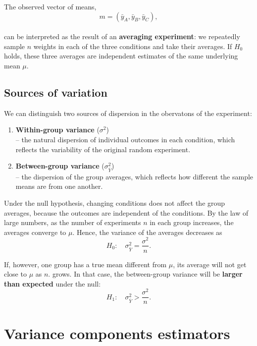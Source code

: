 \documentclass[
]{book}
\begin{document}
The observed vector of means,\\
\[
m = (\bar{y}_A, \bar{y}_B, \bar{y}_C),
\]\\
can be interpreted as the result of an \textbf{averaging experiment}: we repeatedly sample \(n\) weights in each of the three conditions and take their averages. If \(H_0\) holds, these three averages are independent estimates of the same underlying mean \(\mu\).

\hypertarget{sources-of-variation}{%
\subsection{Sources of variation}\label{sources-of-variation}}

We can distinguish two sources of dispersion in the obervatons of the experiment:

\begin{enumerate}
\def\labelenumi{\arabic{enumi}.}
\item
  \textbf{Within-group variance} (\(\sigma^2\))\\
  -- the natural dispersion of individual outcomes in each condition, which reflects the variability of the original random experiment.
\item
  \textbf{Between-group variance} (\(\sigma^2_{\bar{Y}}\))\\
  -- the dispersion of the group averages, which reflects how different the sample means are from one another.
\end{enumerate}

Under the null hypothesis, changing conditions does not affect the group averages, because the outcomes are independent of the conditions. By the law of large numbers, as the number of experiments \(n\) in each group increases, the averages converge to \(\mu\). Hence, the variance of the averages decreases as\\
\[
H_0: \quad \sigma^2_{\bar{Y}} = \frac{\sigma^2}{n}.
\]

If, however, one group has a true mean different from \(\mu\), its average will not get close to \(\mu\) as \(n.\) grows. In that case, the between-group variance will be \textbf{larger than expected} under the null:\\
\[
H_1: \quad \sigma^2_{\bar{Y}} > \frac{\sigma^2}{n}.
\]

\hypertarget{variance-components-estimators}{%
\section{Variance components estimators}\label{variance-components-estimators}}
\end{document}
